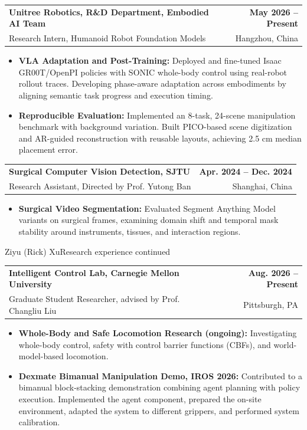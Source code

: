 \documentclass[11pt,letterpaper]{article}
\makeatletter
\newcommand{\resumeSubheading}[4]{
    \begin{tabularx}{\textwidth}{@{}Xr@{}}
        \textbf{#1} & \textbf{#2} \\
        #3 & #4 \\
    \end{tabularx}
}
\newcommand{\resumeItem}[1]{
    \item #1
}
\makeatother
\begin{document}
\resumeSubheading
{ Unitree Robotics, R\&D Department, Embodied AI Team}
{May 2026 -- Present}
{\hspace*{1.4em}Research Intern, Humanoid Robot Foundation Models}
{Hangzhou, China}
\begin{itemize}[leftmargin=2.4em, itemsep=0.5pt, topsep=0pt]
\small
\resumeItem{\textbf{VLA Adaptation and Post-Training:} Deployed and fine-tuned Isaac GR00T/OpenPI policies with SONIC whole-body control using real-robot rollout traces. Developing phase-aware adaptation across embodiments by aligning semantic task progress and execution timing.}
\resumeItem{\textbf{Reproducible Evaluation:} Implemented an 8-task, 24-scene manipulation benchmark with background variation. Built PICO-based scene digitization and AR-guided reconstruction with reusable layouts, achieving 2.5 cm median placement error.}
\end{itemize}

\resumeSubheading
{Surgical Computer Vision Detection, SJTU}
{Apr. 2024 -- Dec. 2024}
{Research Assistant, Directed by Prof. Yutong Ban}
{Shanghai, China}
\begin{itemize}[leftmargin=2.4em, itemsep=0.5pt, topsep=0pt]
\small
\resumeItem{\textbf{Surgical Video Segmentation:} Evaluated Segment Anything Model variants on surgical frames, examining domain shift and temporal mask stability around instruments, tissues, and interaction regions.}
\end{itemize}

\newpage
{\small Ziyu (Rick) Xu}\hfill{\small Research experience continued}
\vspace{4pt}
\resumeSubheading
{Intelligent Control Lab, Carnegie Mellon University}
{Aug. 2026 -- Present}
{\hspace*{1.4em}Graduate Student Researcher, advised by Prof. Changliu Liu}
{Pittsburgh, PA}
\begin{itemize}[leftmargin=2.4em, itemsep=0.5pt, topsep=0pt]
\small
\resumeItem{\textbf{Whole-Body and Safe Locomotion Research (ongoing):} Investigating whole-body control, safety with control barrier functions (CBFs), and world-model-based locomotion.}
\resumeItem{\textbf{Dexmate Bimanual Manipulation Demo, IROS 2026:} Contributed to a bimanual block-stacking demonstration combining agent planning with policy execution. Implemented the agent component, prepared the on-site environment, adapted the system to different grippers, and performed system calibration.}
\end{itemize}
\end{document}
